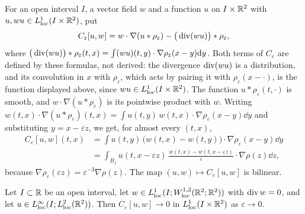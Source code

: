 For an open interval $I$, a vector field $w$ and a function $u$ on
$I\times\mathbb{R}^2$ with $u,wu\in L^1_{\mathrm{loc}}(I\times\mathbb{R}^2)$, put
\[
C_\varepsilon[u,w]=w\cdot\nabla(u\ast\rho_\varepsilon)-\big(\operatorname{div}(wu)\big)\ast\rho_\varepsilon ,
\]
where $\big(\operatorname{div}(wu)\big)\ast\rho_\varepsilon(t,x)=\int(wu)(t,y)\cdot\nabla\rho_\varepsilon(x-y)\dd y$.
Both terms of $C_\varepsilon$ are defined by these formulas, not derived: the
divergence $\operatorname{div}(wu)$ is a distribution,
and its convolution in $x$ with $\rho_\varepsilon$, which acts by pairing it with
$\rho_\varepsilon(x-\cdot)$, is the function displayed above, since $wu\in L^1_{\mathrm{loc}}(I\times\mathbb{R}^2)$.
The function $u\ast\rho_\varepsilon(t,\cdot)$ is smooth, and
$w\cdot\nabla(u\ast\rho_\varepsilon)$ is its pointwise product with $w$. Writing
$w(t,x)\cdot\nabla(u\ast\rho_\varepsilon)(t,x)=\int u(t,y)\,w(t,x)\cdot\nabla\rho_\varepsilon(x-y)\dd y$
and substituting $y=x-\varepsilon z$, we get, for almost every $(t,x)$,
\begin{equation}
\label{eq:comm-formula}
\begin{aligned}
C_\varepsilon[u,w](t,x)&=\int u(t,y)\,\big(w(t,x)-w(t,y)\big)\cdot\nabla\rho_\varepsilon(x-y)\dd y\\
&=\int_{B_1}u(t,x-\varepsilon z)\,\frac{w(t,x)-w(t,x-\varepsilon z)}{\varepsilon}\cdot\nabla\rho(z)\dd z ,
\end{aligned}
\end{equation}
because $\nabla\rho_\varepsilon(\varepsilon z)=\varepsilon^{-3}\nabla\rho(z)$. The map
$(u,w)\mapsto C_\varepsilon[u,w]$ is bilinear.

\begin{lemma}
\label{lem:commutator}
Let $I\subset\mathbb{R}$ be an open interval, let
$w\in L^1_{\mathrm{loc}}(I;W^{1,2}_{\mathrm{loc}}(\mathbb{R}^2;\mathbb{R}^2))$ with
$\operatorname{div} w=0$, and let $u\in L^\infty_{\mathrm{loc}}(I;L^2_{\mathrm{loc}}(\mathbb{R}^2))$.
Then $C_\varepsilon[u,w]\to0$ in $L^1_{\mathrm{loc}}(I\times\mathbb{R}^2)$ as
$\varepsilon\to0$.
\end{lemma}

